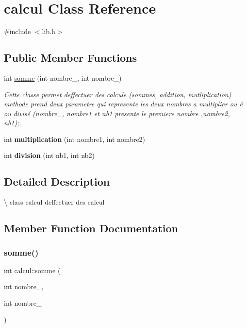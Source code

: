 \hypertarget{classcalcul}{}\section{calcul Class Reference}
\label{classcalcul}


{\ttfamily \#include $<$lib.\+h$>$}

\subsection*{Public Member Functions}
\begin{DoxyCompactItemize}
\item 
int \hyperlink{classcalcul_a40f51a847c5ac1001051a9631e5e1e08}{somme} (int nombre\+\_, int nombre\+\_)
\begin{DoxyCompactList}\small\item\em Cette classe permet d\textquotesingle{}effectuer des calcule (sommes, addition, mutliplication)  methode prend deux parametre qui represente les deux nombres a multiplier ou é ou divisé (nombre\+\_, nombre1 et nb1 presente le premiere nombre ,nombre2, nb1);. \end{DoxyCompactList}\item 
\mbox{\label{classcalcul_aa94bda306aa7209f514bbea550ebf5e3}} 
int {\bfseries multiplication} (int nombre1, int nombre2)
\item 
\mbox{\label{classcalcul_a0325365b6b491fda5ae7b78fc385f22c}} 
int {\bfseries division} (int nb1, int nb2)
\end{DoxyCompactItemize}


\subsection{Detailed Description}
\textbackslash{} class calcul  d\textquotesingle{}effectuer des calcul 

\subsection{Member Function Documentation}
\mbox{\label{classcalcul_a40f51a847c5ac1001051a9631e5e1e08}} 
\subsubsection{\texorpdfstring{somme()}{somme()}}
{\footnotesize\ttfamily int calcul\+::somme (\begin{DoxyParamCaption}\item[{int}]{nombre\+\_,  }\item[{int}]{nombre\+\_ }\end{DoxyParamCaption})}



